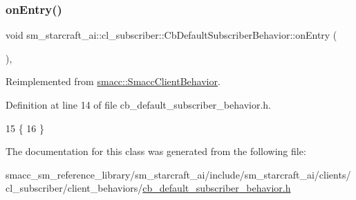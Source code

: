 \subsubsection{\texorpdfstring{on\+Entry()}{onEntry()}}
{\footnotesize\ttfamily void sm\+\_\+starcraft\+\_\+ai\+::cl\+\_\+subscriber\+::\+Cb\+Default\+Subscriber\+Behavior\+::on\+Entry (\begin{DoxyParamCaption}{ }\end{DoxyParamCaption})\hspace{0.3cm}{\ttfamily [inline]}, {\ttfamily [virtual]}}



Reimplemented from \hyperlink{classsmacc_1_1SmaccClientBehavior_a7962382f93987c720ad432fef55b123f}{smacc\+::\+Smacc\+Client\+Behavior}.



Definition at line 14 of file cb\+\_\+default\+\_\+subscriber\+\_\+behavior.\+h.


\begin{DoxyCode}
15     \{
16     \}
\end{DoxyCode}


The documentation for this class was generated from the following file\+:\begin{DoxyCompactItemize}
\item 
smacc\+\_\+sm\+\_\+reference\+\_\+library/sm\+\_\+starcraft\+\_\+ai/include/sm\+\_\+starcraft\+\_\+ai/clients/cl\+\_\+subscriber/client\+\_\+behaviors/\hyperlink{sm__starcraft__ai_2include_2sm__starcraft__ai_2clients_2cl__subscriber_2client__behaviors_2cb__default__subscriber__behavior_8h}{cb\+\_\+default\+\_\+subscriber\+\_\+behavior.\+h}\end{DoxyCompactItemize}
